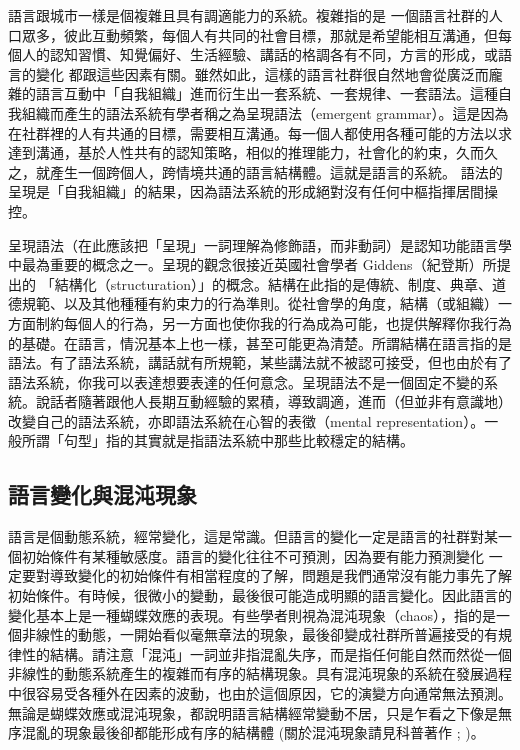 語言跟城市一樣是個複雜且具有調適能力的系統。複雜指的是 一個語言社群的人口眾多，彼此互動頻繁，每個人有共同的社會目標，那就是希望能相互溝通，但每個人的認知習慣、知覺偏好、生活經驗、講話的格調各有不同，方言的形成，或語言的變化 都跟這些因素有關。雖然如此，這樣的語言社群很自然地會從廣泛而龐雜的語言互動中「自我組織」進而衍生出一套系統、一套規律、一套語法。這種自我組織而產生的語法系統有學者稱之為呈現語法（emergent grammar）。這是因為在社群裡的人有共通的目標，需要相互溝通。每一個人都使用各種可能的方法以求達到溝通，基於人性共有的認知策略，相似的推理能力，社會化的約束，久而久之，就產生一個跨個人，跨情境共通的語言結構體。這就是語言的系統。 語法的呈現是「自我組織」的結果，因為語法系統的形成絕對沒有任何中樞指揮居間操控。

呈現語法（在此應該把「呈現」一詞理解為修飾語，而非動詞）是認知功能語言學中最為重要的概念之一。呈現的觀念很接近英國社會學者 Giddens（紀登斯）所提出的 「結構化（structuration）」的概念。結構在此指的是傳統、制度、典章、道德規範、以及其他種種有約束力的行為準則。從社會學的角度，結構（或組織）一方面制約每個人的行為，另一方面也使你我的行為成為可能，也提供解釋你我行為的基礎。在語言，情況基本上也一樣，甚至可能更為清楚。所謂結構在語言指的是語法。有了語法系統，講話就有所規範，某些講法就不被認可接受，但也由於有了語法系統，你我可以表達想要表達的任何意念。呈現語法不是一個固定不變的系統。說話者隨著跟他人長期互動經驗的累積，導致調適，進而（但並非有意識地）改變自己的語法系統，亦即語法系統在心智的表徵（mental representation）。一般所謂「句型」指的其實就是指語法系統中那些比較穩定的結構。

\subsection{語言變化與混沌現象} %

語言是個動態系統，經常變化，這是常識。但語言的變化一定是語言的社群對某一個初始條件有某種敏感度。語言的變化往往不可預測，因為要有能力預測變化 一定要對導致變化的初始條件有相當程度的了解，問題是我們通常沒有能力事先了解初始條件。有時候，很微小的變動，最後很可能造成明顯的語言變化。因此語言的變化基本上是一種蝴蝶效應的表現。有些學者則視為混沌現象（chaos），指的是一個非線性的動態，一開始看似毫無章法的現象，最後卻變成社群所普遍接受的有規律性的結構。請注意「混沌」一詞並非指混亂失序，而是指任何能自然而然從一個非線性的動態系統產生的複雜而有序的結構現象。具有混沌現象的系統在發展過程中很容易受各種外在因素的波動，也由於這個原因，它的演變方向通常無法預測。無論是蝴蝶效應或混沌現象，都說明語言結構經常變動不居，只是乍看之下像是無序混亂的現象最後卻都能形成有序的結構體 (關於混沌現象請見科普著作\citealt{Gleick1988} ; \citealt{Waldrop1992})。

